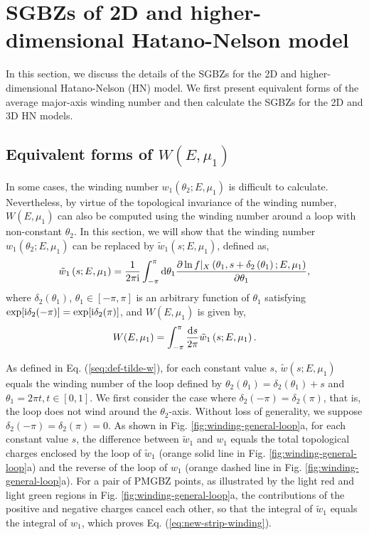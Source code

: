 \section{SGBZs of 2D and higher-dimensional Hatano-Nelson model}

\label{sec:SGBZs-HN}

In this section, we discuss the details of the SGBZs for the 2D and
higher-dimensional Hatano-Nelson (HN) model. We first present equivalent
forms of the average major-axis winding number and then calculate the SGBZs for
the 2D and 3D HN models.

\subsection{Equivalent forms of $W(E, \mu_1)$ }

\label{subsec:Equivalent-forms}

In some cases, the winding number $w_{1}(\theta_{2};E,\mu_{1})$ is
difficult to calculate. Nevertheless, by virtue of the topological
invariance of the winding number, $W(E, \mu_1)$ can also
be computed using the winding number around a loop with non-constant
$\theta_{2}$. In this section, we will show that the winding number
$w_{1}(\theta_{2};E,\mu_{1})$ can be replaced by $\tilde{w}_{1}(s;E,\mu_{1})$,
defined as, 
\begin{equation}
\tilde{w}_{1}\left(s;E,\mu_{1}\right)=\frac{1}{2\pi\mathrm{i}}\int_{-\pi}^{\pi}\mathrm{d}\theta_{1}\frac{\partial\ln f|_{X}\left(\theta_{1},s+\delta_{2}\left(\theta_{1}\right);E,\mu_{1}\right)}{\partial\theta_{1}},\label{seq:def-tilde-w}
\end{equation}
where $\delta_{2}(\theta_{1})$, $\theta_{1}\in[-\pi,\pi]$ is an
arbitrary function of $\theta_{1}$ satisfying $\exp[\mathrm{i}\delta_{2}(-\pi)]=\exp[\mathrm{i}\delta_{2}(\pi)]$,
and $W(E, \mu_1)$ is given by, 
\begin{equation}
W(E,\mu_{1})=\int_{-\pi}^{\pi}\frac{\mathrm{d} s}{2\pi}\tilde{w}_{1}\left(s;E,\mu_{1}\right).\label{eq:new-strip-winding}
\end{equation}

As defined in Eq. (\ref{seq:def-tilde-w}), for each constant value
$s$, $\tilde{w}(s;E,\mu_{1})$ equals the winding number of the loop
defined by $\theta_{2}(\theta_{1})=\delta_{2}(\theta_{1})+s$ and
$\theta_{1}=2\pi t,t\in[0,1]$. We first consider the case where $\delta_{2}(-\pi)=\delta_{2}(\pi)$,
that is, the loop does not wind around the $\theta_{2}$-axis. Without
loss of generality, we suppose $\delta_{2}(-\pi)=\delta_{2}(\pi)=0$.
As shown in Fig. \ref{fig:winding-general-loop}a, for each constant
value $s$, the difference between $\tilde{w}_{1}$ and $w_{1}$ equals
the total topological charges enclosed by the loop of $\tilde{w}_{1}$
(orange solid line in Fig. \ref{fig:winding-general-loop}a) and the
reverse of the loop of $w_{1}$ (orange dashed line in Fig. \ref{fig:winding-general-loop}a).
For a pair of PMGBZ points, as illustrated by the light red and light
green regions in Fig. \ref{fig:winding-general-loop}a, the contributions
of the positive and negative charges cancel each other, so that the
integral of $\tilde{w}_{1}$ equals the integral of $w_{1}$, which
proves Eq. (\ref{eq:new-strip-winding}).


